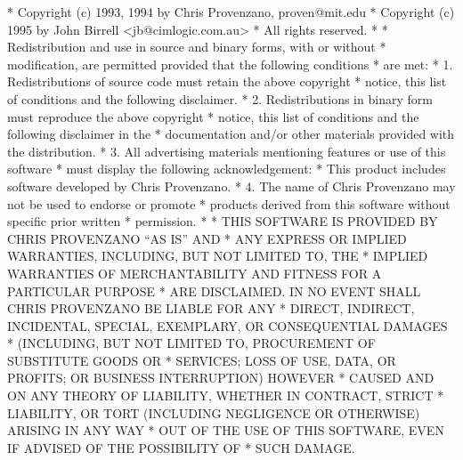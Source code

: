 \begin{copyrightEnv}
 * Copyright (c) 1993, 1994 by Chris Provenzano, proven@mit.edu
 * Copyright (c) 1995 by John Birrell <jb@cimlogic.com.au>
 * All rights reserved.
 *
 * Redistribution and use in source and binary forms, with or without
 * modification, are permitted provided that the following conditions
 * are met:
 * 1. Redistributions of source code must retain the above copyright
 *    notice, this list of conditions and the following disclaimer.
 * 2. Redistributions in binary form must reproduce the above copyright
 *    notice, this list of conditions and the following disclaimer in the
 *    documentation and/or other materials provided with the distribution.
 * 3. All advertising materials mentioning features or use of this software
 *    must display the following acknowledgement:
 *  This product includes software developed by Chris Provenzano.
 * 4. The name of Chris Provenzano may not be used to endorse or promote
 *        products derived from this software without specific prior written
 *        permission.
 *
 * THIS SOFTWARE IS PROVIDED BY CHRIS PROVENZANO ``AS IS'' AND
 * ANY EXPRESS OR IMPLIED WARRANTIES, INCLUDING, BUT NOT LIMITED TO, THE
 * IMPLIED WARRANTIES OF MERCHANTABILITY AND FITNESS FOR A PARTICULAR PURPOSE
 * ARE DISCLAIMED.  IN NO EVENT SHALL CHRIS PROVENZANO BE LIABLE FOR ANY
 * DIRECT, INDIRECT, INCIDENTAL, SPECIAL, EXEMPLARY, OR CONSEQUENTIAL DAMAGES
 * (INCLUDING, BUT NOT LIMITED TO, PROCUREMENT OF SUBSTITUTE GOODS OR
 * SERVICES; LOSS OF USE, DATA, OR PROFITS; OR BUSINESS INTERRUPTION) HOWEVER
 * CAUSED AND ON ANY THEORY OF LIABILITY, WHETHER IN CONTRACT, STRICT
 * LIABILITY, OR TORT (INCLUDING NEGLIGENCE OR OTHERWISE) ARISING IN ANY WAY
 * OUT OF THE USE OF THIS SOFTWARE, EVEN IF ADVISED OF THE POSSIBILITY OF
 * SUCH DAMAGE.
\end{copyrightEnv}

